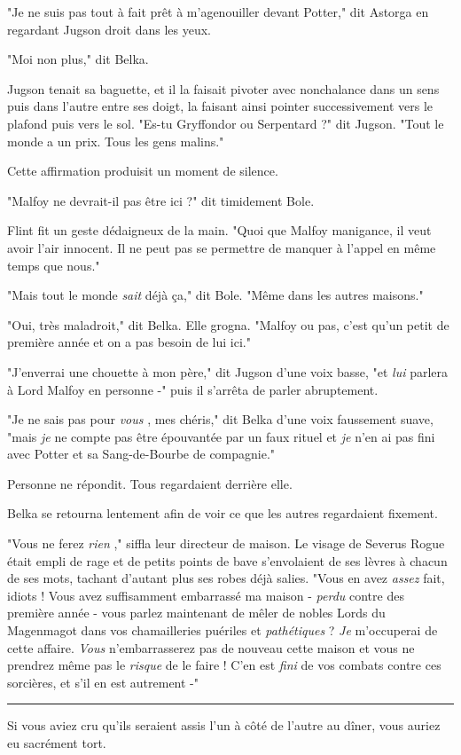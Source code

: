 "Je ne suis pas tout à fait prêt à m'agenouiller devant Potter," dit Astorga en regardant Jugson droit dans les yeux.

"Moi non plus," dit Belka.

Jugson tenait sa baguette, et il la faisait pivoter avec nonchalance dans un sens puis dans l'autre entre ses doigt, la faisant ainsi pointer successivement vers le plafond puis vers le sol. "Es-tu Gryffondor ou Serpentard ?" dit Jugson. "Tout le monde a un prix. Tous les gens malins."

Cette affirmation produisit un moment de silence.

"Malfoy ne devrait-il pas être ici ?" dit timidement Bole.

Flint fit un geste dédaigneux de la main. "Quoi que Malfoy manigance, il veut avoir l'air innocent. Il ne peut pas se permettre de manquer à l'appel en même temps que nous."

"Mais tout le monde \emph{sait}  déjà ça," dit Bole. "Même dans les autres maisons."

"Oui, très maladroit," dit Belka. Elle grogna. "Malfoy ou pas, c'est qu'un petit de première année et on a pas besoin de lui ici."

"J'enverrai une chouette à mon père," dit Jugson d'une voix basse, "et \emph{lui}  parlera à Lord Malfoy en personne -" puis il s'arrêta de parler abruptement.

"Je ne sais pas pour \emph{vous} , mes chéris," dit Belka d'une voix faussement suave, "mais \emph{je}  ne compte pas être épouvantée par un faux rituel et \emph{je}  n'en ai pas fini avec Potter et sa Sang-de-Bourbe de compagnie."

Personne ne répondit. Tous regardaient derrière elle.

Belka se retourna lentement afin de voir ce que les autres regardaient fixement.

"Vous ne ferez \emph{rien} ," siffla leur directeur de maison. Le visage de Severus Rogue était empli de rage et de petits points de bave s'envolaient de ses lèvres à chacun de ses mots, tachant d'autant plus ses robes déjà salies. "Vous en avez \emph{assez}  fait, idiots ! Vous avez suffisamment embarrassé ma maison - \emph{perdu}  contre des première année - vous parlez maintenant de mêler de nobles Lords du Magenmagot dans vos chamailleries puériles et \emph{pathétiques}  ? \emph{Je}  m'occuperai de cette affaire. \emph{Vous}  n'embarrasserez pas de nouveau cette maison et vous ne prendrez même pas le \emph{risque}  de le faire ! C'en est \emph{fini}  de vos combats contre ces sorcières, et s'il en est autrement -"
\par\noindent\rule{\textwidth}{0.4pt}
Si vous aviez cru qu'ils seraient assis l'un à côté de l'autre au dîner, vous auriez eu sacrément tort.

